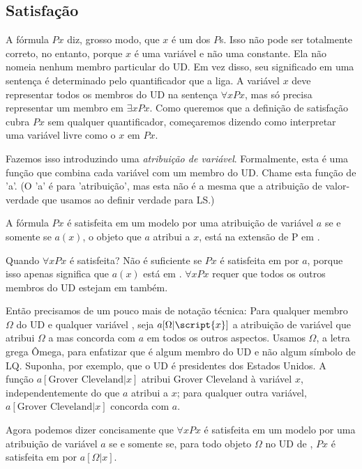 \subsection{Satisfação}

A fórmula $Px$ diz, grosso modo, que $x$ é um dos $P$s. Isso não pode ser totalmente correto, no entanto, porque $x$ é uma variável e não uma constante. Ela não nomeia nenhum membro particular do UD. Em vez disso, seu significado em uma sentença é determinado pelo quantificador que a liga. A variável $x$ deve representar todos os membros do UD na sentença $\forall xPx$, mas só precisa representar um membro em $\exists xPx$. Como queremos que a definição de satisfação cubra $Px$ sem qualquer quantificador, começaremos dizendo como interpretar uma variável livre como o $x$ em $Px$.

Fazemos isso introduzindo uma \emph{atribuição de variável}. Formalmente, esta é uma função que combina cada variável com um membro do UD. Chame esta função de 'a'. (O 'a' é para 'atribuição', mas esta não é a mesma que a atribuição de valor-verdade que usamos ao definir verdade para LS.)

A fórmula $Px$ é satisfeita em um modelo  por uma atribuição de variável $a$ se e somente se $a(x)$, o objeto que $a$ atribui a $x$, está na extensão de P em .

Quando $\forall x Px$ é satisfeita? Não é suficiente se $Px$ é satisfeita em  por $a$, porque isso apenas significa que $a(x)$ está em . $\forall x Px$ requer que todos os outros membros do UD estejam em  também.

Então precisamos de um pouco mais de notação técnica: Para qualquer membro $\Omega$ do UD e qualquer variável , seja $a[\Omega|\script{x}]$ a atribuição de variável que atribui $\Omega$ a  mas concorda com $a$ em todos os outros aspectos. Usamos $\Omega$, a letra grega Ômega, para enfatizar que é algum membro do UD e não algum símbolo de LQ. Suponha, por exemplo, que o UD é presidentes dos Estados Unidos. A função $a[\mbox{Grover Cleveland}|x]$ atribui Grover Cleveland à variável $x$, independentemente do que $a$ atribui a $x$; para qualquer outra variável, $a[\mbox{Grover Cleveland}|x]$ concorda com $a$.

Agora podemos dizer concisamente que $\forall x Px$ é satisfeita em um modelo  por uma atribuição de variável $a$ se e somente se, para todo objeto $\Omega$ no UD de , $Px$ é satisfeita em  por $a[\Omega|x]$.

